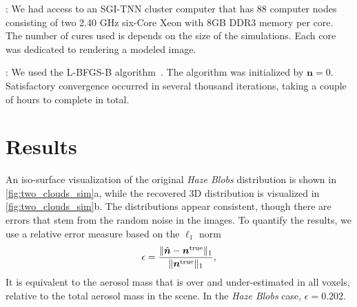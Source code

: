 \documentclass[10pt,letterpaper]{article}
\begin{document}
: We had access to an SGI-TNN cluster computer
that has 88 computer nodes consisting of two 2.40 GHz six-Core Xeon
with 8GB DDR3 memory per core. The number of cures used is depends on
the size of the simulations. Each core was dedicated to rendering a
modeled image.

: We used the L-BFGS-B
algorithm~\cite{BFGS}. The algorithm was initialized by ${\bm
  n}=0$. Satisfactory convergence occurred in several thousand
iterations, taking a couple of hours to complete in total.


\section{Results}
\label{sec:optimization-results}

An iso-surface visualization of the original {\em Haze Blobs}
distribution is shown in \cref{fig:two_clouds_sim}a, while the
recovered 3D distribution is visualized in
\cref{fig:two_clouds_sim}b. The distributions appear consistent,
though there are errors that stem from the random noise in the
images. To quantify the results, we use a relative error measure based
on the $\ell_1$ norm
\begin{equation}
  \label{eq:ndiff}
  \epsilon=\frac{\| \hat{\bm n}  - {\bm n}^{\rm true} \|_1}
  {\| {\bm n}^{\rm true} \|_1} ,
\end{equation}
It is equivalent to the aerosol mass that is over and under-estimated
in all voxels, relative to the total aerosol mass in the scene.  In
the {\em Haze Blobs} case, $\epsilon=0.202$.
\end{document}
